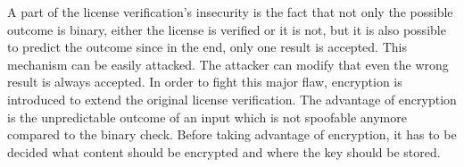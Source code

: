 A part of the license verification's insecurity is the fact that not only the possible outcome is binary, either the license is verified or it is not, but it is also possible to predict the outcome since in the end, only one result is accepted.
This mechanism can be easily attacked.
The attacker can modify that even the wrong result is always accepted.
\newline
In order to fight this major flaw, encryption is introduced to extend the original license verification.
The advantage of encryption is the unpredictable outcome of an input which is not spoofable anymore compared to the binary check.
Before taking advantage of encryption, it has to be decided what content should be encrypted and where the key should be stored.
